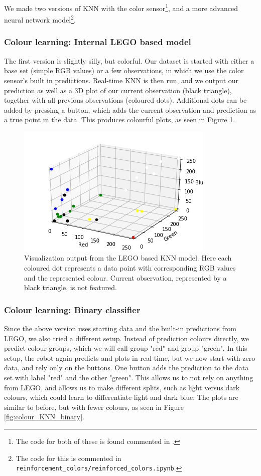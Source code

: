 \documentclass[11pt, a4paper]{article}
\begin{document}
	We made two versions of KNN with the color sensor\footnote{The code for both of these is found commented in .}, and a more advanced neural network model\footnote{The code for this is commented in \texttt{reinforcement\_colors/reinforced\_colors.ipynb}.}.
	\subsubsection{Colour learning: Internal LEGO based model}
	The first version is slightly silly, but colorful. Our dataset is started with either a base set (simple RGB values) or a few observations, in which we use the color sensor's built in predictions. Real-time KNN is then run, and we output our prediction as well as a 3D plot of our current observation (black triangle), together with all previous observations (coloured dots). Additional dots can be added by pressing a button, which adds the current observation and prediction as a true point in the data. This produces colourful plots, as seen in Figure \ref{fig:colour_KNN_LEGO}.
	
	\begin{figure}[H]
		\centering
		\includegraphics[width=0.6\linewidth]{images/ColourKNNversion1.png} 	
		\caption{Visualization output from the LEGO based KNN model. Here each coloured dot represents a data point with corresponding RGB values and the represented colour. Current observation, represented by a black triangle, is not featured.}
		\label{fig:colour_KNN_LEGO}
	\end{figure}
	\subsubsection{Colour learning: Binary classifier}
	Since the above version uses starting data and the built-in predictions from LEGO, we also tried a different setup. Instead of prediction colours directly, we predict colour groups, which we will call group "red" and group "green". In this setup, the robot again predicts and plots in real time, but we now start with zero data, and rely only on the buttons. One button adds the prediction to the data set with label "red" and the other "green". This allows us to not rely on anything from LEGO, and allows us to make different splits, such as light versus dark colours, which could learn to differentiate light and dark blue. The plots are similar to before, but with fewer colours, as seen in Figure \ref{fig:colour_KNN_binary}.
	
\end{document}
